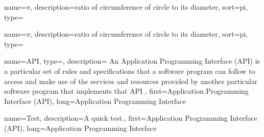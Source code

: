 
{
  name={\ensuremath{\pi}},
  description={ratio of circumference of circle to its diameter},
  sort=pi,
  type=\symboltype
}

{
  name={\ensuremath{\pi}},
  description={ratio of circumference of circle to its diameter},
  sort=pi,
  type=\symboltype
}

{
    name={API},
    type=\glossarytype,
    description={
        An Application Programming Interface (API) is a particular set of rules and specifications that a software program can follow to access and make use of the services and resources provided by another particular software program that implements that API
    },
    first={Application Programming Interface (API)},
    long={Application Programming Interface}
}

{
    name={Test},
    description={A quick test.},
    first={Application Programming Interface (API)},
    long={Application Programming Interface}
}